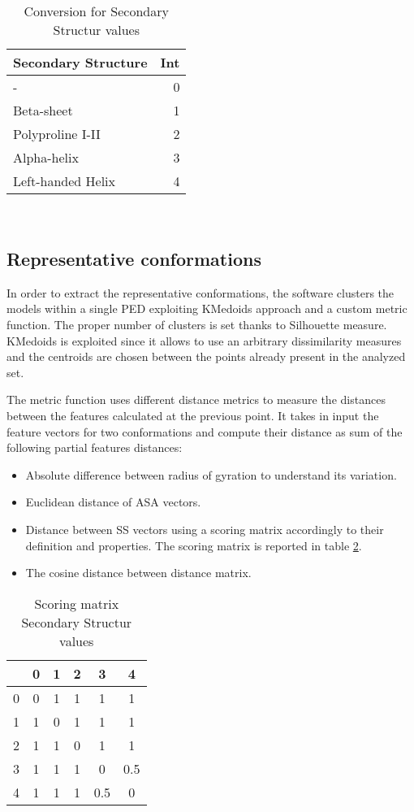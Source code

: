 \begin{table}[H]
\begin{center}
\begin{tabular}{lr}
\textbf{Secondary Structure} & \textbf{Int}\\
\hline
- & 0\\
\hline
Beta-sheet & 1\\
\hline
Polyproline I-II & 2\\
\hline
Alpha-helix & 3\\
\hline
Left-handed Helix & 4\\
\end{tabular}
\end{center}
\caption{Conversion for Secondary Structur values}~\label{tab:ss}
\end{table}



\subsection{Representative conformations} 
In order to extract the representative conformations, the software clusters the models within a single PED exploiting KMedoids approach and a custom metric function. The proper number of clusters is set thanks to Silhouette measure. 
KMedoids is exploited since it allows to use an arbitrary dissimilarity measures and the centroids are chosen between the points already present in the analyzed set. 

\medskip
The metric function uses different distance metrics to measure the distances between the features calculated at the previous point. It takes in input the feature vectors for two conformations and compute their distance as sum of the following partial features distances:
\begin{itemize}
\item Absolute difference between radius of gyration to understand its variation.
\item Euclidean distance of ASA vectors.
\item Distance between SS vectors using a scoring matrix accordingly to their definition and properties. The scoring matrix is reported in table \ref{tab:score}. 
\item The cosine distance between distance matrix. 
\end{itemize}

\begin{table}[H]
\begin{center}
\begin{tabular}{c|ccccc}
& 0 & 1 & 2 & 3 & 4 \\
\hline
0 & 0 & 1 & 1 & 1 & 1\\
1 & 1 & 0 & 1 & 1 & 1\\
2 & 1 & 1 & 0 & 1 & 1\\
3 & 1 & 1 & 1 & 0 & 0.5\\
4 & 1 & 1 & 1 & 0.5 & 0\\
\end{tabular}
\end{center}
\caption{Scoring matrix Secondary Structur values}~\label{tab:score}
\end{table}


